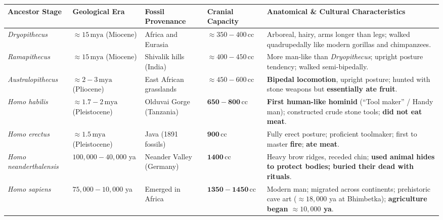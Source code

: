 \documentclass[10pt,a4paper]{article}
\begin{document}
\begin{conceptbox}
\begin{center}
\scriptsize
\begin{tabular}{|p{2.2cm}|p{1.6cm}|p{2.0cm}|p{1.5cm}|p{6.8cm}|}
\hline
\textbf{Ancestor Stage} & \textbf{Geological Era} & \textbf{Fossil Provenance} & \textbf{Cranial Capacity} & \textbf{Anatomical \& Cultural Characteristics} \\
\hline
\textit{Dryopithecus} & $\approx 15\,\mathrm{mya}$ (Miocene) & Africa and Eurasia & $\approx 350-400\,\mathrm{cc}$ & Arboreal, hairy, arms longer than legs; walked quadrupedally like modern gorillas and chimpanzees. \\
\hline
\textit{Ramapithecus} & $\approx 15\,\mathrm{mya}$ (Miocene) & Shivalik hills (India) & $\approx 400-450\,\mathrm{cc}$ & More man-like than \textit{Dryopithecus}; upright posture tendency; walked semi-bipedally. \\
\hline
\textit{Australopithecus} & $\approx 2-3\,\mathrm{mya}$ (Pliocene) & East African grasslands & $\approx 450-600\,\mathrm{cc}$ & \textbf{Bipedal locomotion}, upright posture; hunted with stone weapons but \textbf{essentially ate fruit}. \\
\hline
\textit{Homo habilis} & $\approx 1.7-2\,\mathrm{mya}$ (Pleistocene) & Olduvai Gorge (Tanzania) & $\mathbf{650-800\,\mathrm{cc}}$ & \textbf{First human-like hominid} (``Tool maker'' / Handy man); constructed crude stone tools; \textbf{did not eat meat}. \\
\hline
\textit{Homo erectus} & $\approx 1.5\,\mathrm{mya}$ (Pleistocene) & Java (1891 fossils) & $\mathbf{900\,\mathrm{cc}}$ & Fully erect posture; proficient toolmaker; first to master \textbf{fire}; \textbf{ate meat}. \\
\hline
\textit{Homo neanderthalensis} & $100,000-40,000$ ya & Neander Valley (Germany) & $\mathbf{1400\,\mathrm{cc}}$ & Heavy brow ridges, receded chin; \textbf{used animal hides to protect bodies; buried their dead with rituals}. \\
\hline
\textit{Homo sapiens} & $75,000-10,000$ ya & Emerged in Africa & $\mathbf{1350-1450\,\mathrm{cc}}$ & Modern man; migrated across continents; prehistoric cave art ($\approx 18,000$ ya at Bhimbetka); \textbf{agriculture began $\approx 10,000$ ya}. \\
\hline
\end{tabular}
\end{center}
\end{conceptbox}
\end{document}
